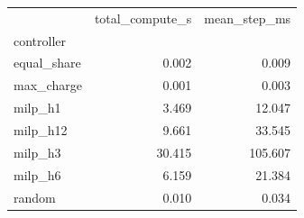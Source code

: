 \begin{tabular}{lrr}
\toprule
 & total_compute_s & mean_step_ms \\
controller &  &  \\
\midrule
equal_share & 0.002 & 0.009 \\
max_charge & 0.001 & 0.003 \\
milp_h1 & 3.469 & 12.047 \\
milp_h12 & 9.661 & 33.545 \\
milp_h3 & 30.415 & 105.607 \\
milp_h6 & 6.159 & 21.384 \\
random & 0.010 & 0.034 \\
\bottomrule
\end{tabular}
